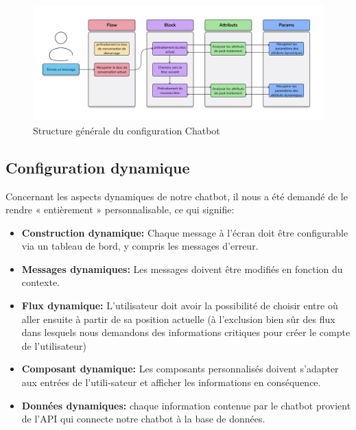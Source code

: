 \begin{figure}[H] 
    \centering
    \includegraphics[scale=0.5]{Figures/chatbot.png}
    \caption{Structure générale du configuration Chatbot}
\end{figure}

\subsection{Configuration dynamique}

\hspace{16pt}Concernant les aspects dynamiques de notre chatbot, il nous a été demandé de le rendre « entièrement » personnalisable, ce qui signifie:

\begin{itemize}
  \item \textbf{Construction dynamique: }Chaque message à l'écran doit être configurable via un tableau de bord, y compris les messages d'erreur.
  \item \textbf{Messages dynamiques: }Les messages doivent être modifiés en fonction du contexte.
  \item \textbf{Flux dynamique: }L'utilisateur doit avoir la possibilité de choisir entre où aller ensuite à partir de sa position actuelle (à l'exclusion bien sûr des flux dans lesquels nous demandons des informations critiques pour créer le compte de l'utilisateur)
  \item \textbf{Composant dynamique: }Les composants personnalisés doivent s'adapter aux entrées de l'utili-sateur et afficher les informations en conséquence.
  \item \textbf{Données dynamiques: }chaque information contenue par le chatbot provient de l'API qui connecte notre chatbot à la base de données.
\end{itemize}


